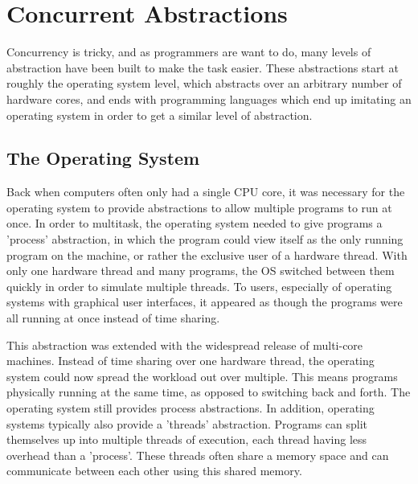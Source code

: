 \documentclass{article}
\begin{document}

\section{Concurrent Abstractions}
Concurrency is tricky, and as programmers are want to do, many levels of abstraction
have been built to make the task easier. These abstractions start at roughly the operating
system level, which abstracts over an arbitrary number of hardware cores, and ends with
programming languages which end up imitating an operating system in order to get a similar
level of abstraction.

\subsection{The Operating System}
Back when computers often only had a single CPU core, it was necessary for the
operating system to provide abstractions to allow multiple programs to run at
once. In order to multitask, the operating system needed to give programs a
'process' abstraction, in which the program could view itself as the only
running program on the machine, or rather the exclusive user of a hardware
thread. With only one hardware thread and many programs, the OS switched between
them quickly in order to simulate multiple threads. To users, especially of
operating systems with graphical user interfaces, it appeared as though the
programs were all running at once instead of time sharing.

This abstraction was extended with the widespread release of multi-core
machines. Instead of time sharing over one hardware thread, the operating system
could now spread the workload out over multiple. This means programs physically
running at the same time, as opposed to switching back and forth. The operating
system still provides process abstractions. In addition, operating systems
typically also provide a 'threads' abstraction. Programs can split themselves up
into multiple threads of execution, each thread having less overhead than a
'process'. These threads often share a memory space and can communicate between
each other using this shared memory.
\end{document}
